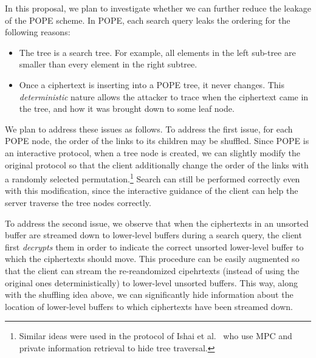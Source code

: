 In this proposal, we plan to investigate whether we can further reduce the
leakage of the POPE scheme. 
%
In POPE, each search query leaks the ordering  for the following reasons: 

\begin{itemize}\setlength\itemsep{0em}
\item The tree is a search tree. For example, all elements in the
  left sub-tree are smaller than every element in the right subtree.
 
\item Once a ciphertext is inserting into a POPE tree, it never changes. This {\em
  deterministic} nature allows the attacker to trace when the ciphertext came
  in the tree, and how it was brought down to some leaf node.  
\end{itemize}

We plan to address these issues as follows. To address the first issue, for
each POPE node, the order of the links to its children may be shuffled. Since
POPE is an interactive protocol, when a tree node is created, we can slightly
modify the original protocol so that the client additionally change the order
of the links with a randomly selected permutation.\footnote{Similar ideas were used in the protocol of Ishai et al.~\cite{RSA:IKLO16} who use MPC and private information retrieval to hide tree traversal.}
%
Search can still be performed correctly even with this
modification, since the interactive guidance of the client can help the server
traverse the tree nodes correctly. 
    
To address the second issue, we observe that when the ciphertexts in an
unsorted buffer are streamed down to lower-level buffers during a search query,
the client first {\em decrypts} them in order to indicate the correct unsorted
lower-level buffer to which the ciphertexts should move. This procedure can be
easily augmented so that the client can stream the {re-reandomized cipehrtexts}
(instead of using the original ones deterministically) to lower-level unsorted
buffers. This way, along with the shuffling idea above, we can significantly
hide information about the location of lower-level buffers to which ciphertexts
have been streamed down. 


